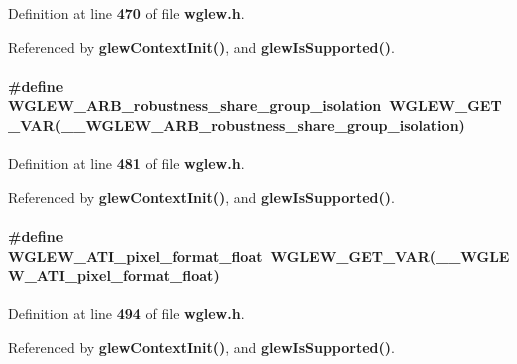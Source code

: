 Definition at line {\bf 470} of file {\bf wglew.\+h}.



Referenced by {\bf glew\+Context\+Init()}, and {\bf glew\+Is\+Supported()}.

\paragraph[{W\+G\+L\+E\+W\+\_\+\+A\+R\+B\+\_\+robustness\+\_\+share\+\_\+group\+\_\+isolation}]{\setlength{\rightskip}{0pt plus 5cm}\#define W\+G\+L\+E\+W\+\_\+\+A\+R\+B\+\_\+robustness\+\_\+share\+\_\+group\+\_\+isolation~{\bf W\+G\+L\+E\+W\+\_\+\+G\+E\+T\+\_\+\+V\+AR}({\bf \+\_\+\+\_\+\+W\+G\+L\+E\+W\+\_\+\+A\+R\+B\+\_\+robustness\+\_\+share\+\_\+group\+\_\+isolation})}\label{wglew_8h_a56937f006c0fa151b0dcbc9aa708fce6}


Definition at line {\bf 481} of file {\bf wglew.\+h}.



Referenced by {\bf glew\+Context\+Init()}, and {\bf glew\+Is\+Supported()}.

\paragraph[{W\+G\+L\+E\+W\+\_\+\+A\+T\+I\+\_\+pixel\+\_\+format\+\_\+float}]{\setlength{\rightskip}{0pt plus 5cm}\#define W\+G\+L\+E\+W\+\_\+\+A\+T\+I\+\_\+pixel\+\_\+format\+\_\+float~{\bf W\+G\+L\+E\+W\+\_\+\+G\+E\+T\+\_\+\+V\+AR}({\bf \+\_\+\+\_\+\+W\+G\+L\+E\+W\+\_\+\+A\+T\+I\+\_\+pixel\+\_\+format\+\_\+float})}\label{wglew_8h_aca98c858a90d7fb2245af5740d296624}


Definition at line {\bf 494} of file {\bf wglew.\+h}.



Referenced by {\bf glew\+Context\+Init()}, and {\bf glew\+Is\+Supported()}.

